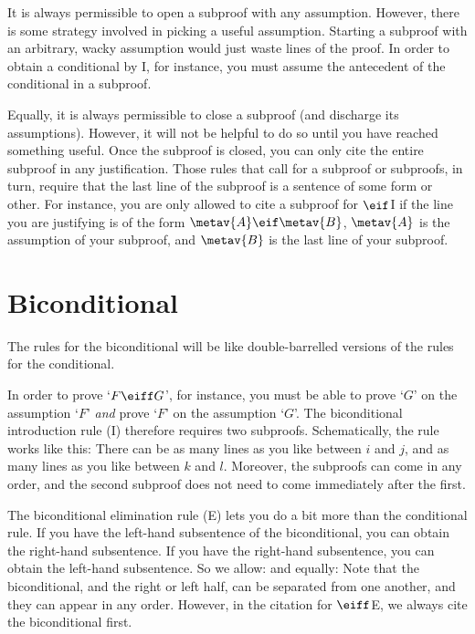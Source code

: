 It is always permissible to open a subproof with any assumption. However, there is some strategy involved in picking a useful assumption. Starting a subproof with an arbitrary, wacky assumption would just waste lines of the proof. In order to obtain a conditional by {\eif}I, for instance, you must assume the antecedent of the conditional in a subproof.

Equally, it is always permissible to close a subproof (and discharge its assumptions). However, it will not be helpful to do so until you have reached something useful. Once the subproof is closed, you can only cite the entire subproof in any justification. Those rules that call for a subproof or subproofs, in turn, require that the last line of the subproof is a sentence of some form or other. For instance, you are only allowed to cite a subproof for $\eif$I if the line you are justifying is of the form $\metav{A} \eif \metav{B}$, $\metav{A}$ is the assumption of your subproof, and $\metav{B}$ is the last line of your subproof.


\section{Biconditional}
The rules for the biconditional will be like double-barrelled versions of the rules for the conditional.

In order to prove `$F \eiff G$', for instance, you must be able to prove `$G$' on the assumption `$F$' \emph{and} prove `$F$' on the assumption `$G$'. The biconditional introduction rule ({\eiff}I) therefore requires two subproofs. Schematically, the rule works like this: 
There can be as many lines as you like between $i$ and $j$, and as many lines as you like between $k$ and $l$. Moreover, the subproofs can come in any order, and the second subproof does not need to come immediately after the first.

The biconditional elimination rule ({\eiff}E) lets you do a bit more than the conditional rule. If you have the left-hand subsentence of the biconditional, you can obtain the right-hand subsentence. If you have the right-hand subsentence, you can obtain the left-hand subsentence. So we allow:
and equally:
Note that the biconditional, and the right or left half, can be separated from one another, and they can appear in any order. However, in the citation for $\eiff$E, we always cite the biconditional first.

